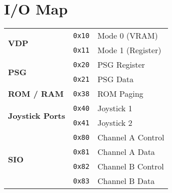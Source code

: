 \section{I/O Map}

\begin{tabular}{l l l }
    \hline
    \multirow{2}{*}{\textbf{VDP}} & \texttt{0x10} & Mode 0 (VRAM)\\
    & \texttt{0x11} & Mode 1 (Register)\\
    \hline
    \multirow{2}{*}{\textbf{PSG}} & \texttt{0x20} & PSG Register\\
    & \texttt{0x21} & PSG Data\\
    \hline
    \textbf{ROM / RAM} & \texttt{0x38} & ROM Paging\\
    \hline
    \multirow{2}{*}{\textbf{Joystick Ports}} & \texttt{0x40} 
    & Joystick 1\\
    & \texttt{0x41} & Joystick 2\\
    \hline
    \multirow{4}{*}{\textbf{SIO}} & \texttt{0x80} & Channel A Control\\
    & \texttt{0x81} & Channel A Data\\
    & \texttt{0x82} & Channel B Control\\
    & \texttt{0x83} & Channel B Data\\
    \hline
\end{tabular}